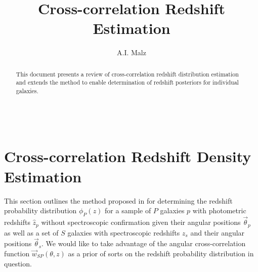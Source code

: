 \documentclass[12pt, onecolumn]{emulateapj}
\begin{document}
\begin{align}
\end{align}

\title{Cross-correlation Redshift Estimation}

\author{A.I. Malz}

\begin{abstract}
This document presents a review of cross-correlation redshift distribution estimation and extends the method to enable determination of redshift posteriors for individual galaxies.
\end{abstract}


\section{Cross-correlation Redshift Density Estimation}
\label{sec:review}

This section outlines the method proposed in \citet{new08} for determining the redshift probability distribution $\phi_{P}(z)$ for a sample of $P$ galaxies $p$ with photometric redshifts $\hat{z}_{p}$ without spectroscopic confirmation given their angular positions $\vec{\theta}_{p}$ as well as a set of $S$ galaxies with spectroscopic redshifts $z_{s}$ and their angular positions $\vec{\theta}_{s}$.  We would like to take advantage of the angular cross-correlation function $\vec{w}_{SP}(\theta,z)$ as a prior of sorts on the redshift probability distribution in question.
\end{document}
